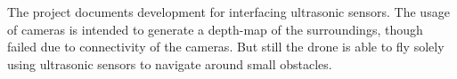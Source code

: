 \documentclass[ a4paper,
                oneside,
                toc=bibliography,
                toc=listof
                ]{scrbook}
\begin{document}
The project documents development for interfacing ultrasonic sensors. The usage of cameras is intended to generate a depth-map of the surroundings, though failed due to connectivity of the cameras. But still the drone is able to fly solely using ultrasonic sensors to navigate around small obstacles.

    \cleardoublepage
    \tableofcontents

    \mainmatter

    
    
    
    
    
    
    
    
    \appendix
    


    \backmatter
    \cleardoublepage
    \printbibliography

    \cleardoublepage
    \listoffigures
    \cleardoublepage
    \listoftables
    \cleardoublepage
    \printnoidxglossaries
\end{document}
